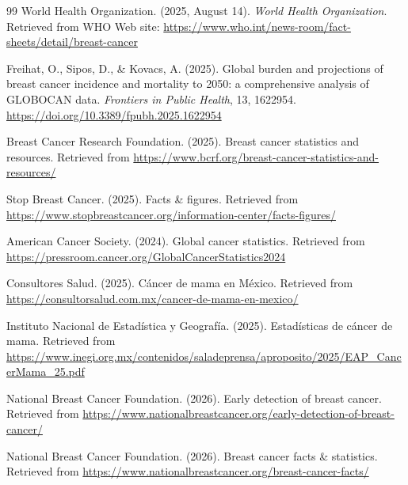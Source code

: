 \begin{thebibliography}{99}
    World Health Organization. (2025, August 14). \textit{World Health Organization}.
    Retrieved from WHO Web site:
    \url{https://www.who.int/news-room/fact-sheets/detail/breast-cancer}

    Freihat, O., Sipos, D., \& Kovacs, A. (2025). Global burden and projections of
    breast cancer incidence and mortality to 2050: a comprehensive analysis of
    GLOBOCAN data. \textit{Frontiers in Public Health}, 13, 1622954.
    \url{https://doi.org/10.3389/fpubh.2025.1622954}

    Breast Cancer Research Foundation. (2025). Breast cancer statistics and resources.
    Retrieved from \url{https://www.bcrf.org/breast-cancer-statistics-and-resources/}

    Stop Breast Cancer. (2025). Facts \& figures. Retrieved from
    \url{https://www.stopbreastcancer.org/information-center/facts-figures/}

    American Cancer Society. (2024). Global cancer statistics. Retrieved from
    \url{https://pressroom.cancer.org/GlobalCancerStatistics2024}

    Consultores Salud. (2025). Cáncer de mama en México. Retrieved from
    \url{https://consultorsalud.com.mx/cancer-de-mama-en-mexico/}

    Instituto Nacional de Estadística y Geografía. (2025). Estadísticas de cáncer de mama.
    Retrieved from \url{https://www.inegi.org.mx/contenidos/saladeprensa/aproposito/2025/EAP_CancerMama_25.pdf}

    National Breast Cancer Foundation. (2026). Early detection of breast cancer.
    Retrieved from \url{https://www.nationalbreastcancer.org/early-detection-of-breast-cancer/}

    National Breast Cancer Foundation. (2026). Breast cancer facts \& statistics.
    Retrieved from \url{https://www.nationalbreastcancer.org/breast-cancer-facts/}


\end{thebibliography}
